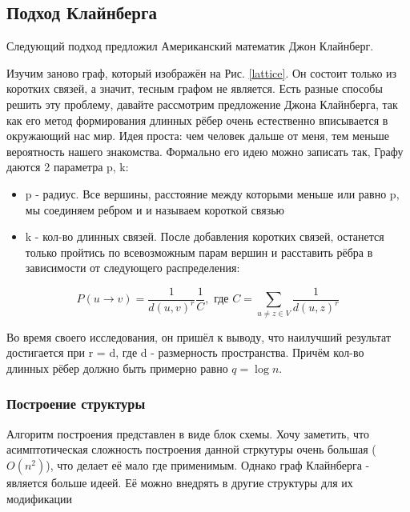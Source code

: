 \subsection{Подход Клайнберга}

    Следующий подход предложил Американский математик Джон Клайнберг. \cite{Kleinberg, Kleinberg2}

    Изучим заново граф, который изображён на Рис. \ref{lattice}. Он состоит только из
коротких связей, а значит, тесным графом не является. Есть разные способы решить эту проблему,
давайте рассмотрим предложение Джона Клайнберга, так как его метод формирования длинных
рёбер очень естественно вписывается в окружающий нас мир. Идея проста: чем человек дальше от меня, тем меньше
вероятность нашего знакомства. Формально его идею можно записать так, 
Графу даются 2 параметра p, k:
\begin{itemize}
    \item p - радиус. Все вершины, расстояние между которыми меньше или равно p, мы соединяем ребром и 
    и называем короткой связью
    \item k - кол-во длинных связей. После добавления коротких связей, останется только пройтись по всевозможным 
    парам вершин и расставить рёбра в зависимости от следующего распределения:
\end{itemize}

\begin{equation} \label{edges_distribution}
    P(u \rightarrow v) = \frac{1}{d(u, v)^r}\frac{1}{C}, \text{ где } C = \sum_{u \neq z \in V}\frac{1}{d(u, z)^r}
\end{equation}

Во время своего исследования, он пришёл к выводу, что наилучший результат достигается при 
r = d, где d - размерность пространства. Причём кол-во длинных рёбер должно быть 
примерно равно $q = \log{n}$.

\subsubsection{Построение структуры}
Алгоритм построения представлен в виде блок схемы. Хочу заметить, что асимптотическая
сложность построения данной стркутуры очень большая ($O(n^2)$), что делает её мало где применимым.
Однако граф Клайнберга - является больше идеей. Её можно внедрять в другие структуры для 
их модификации 

